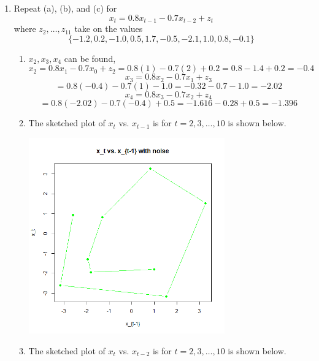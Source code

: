 \documentclass[12pt]{article}
\begin{document}
\begin{enumerate}
\begin{enumerate}
\begin{center}
        \end{center}
        \item Repeat (a), (b), and (c) for
        \[ x_t = 0.8x_{t-1} - 0.7x_{t-2} + z_t \]
        where $z_2, \ldots, z_{11}$ take on the values
        \[ 
        \{ -1.2, 0.2, -1.0, 0.5, 1.7, -0.5, -2.1, 1.0, 0.8, -0.1 \} 
        \]
        \begin{enumerate}
            \item $x_2, x_3, x_4$ can be found,
            \[ 
            x_2 = 0.8x_1 - 0.7x_0 + z_2 
            = 0.8(1) - 0.7(2) + 0.2
            = 0.8 - 1.4 + 0.2 = -0.4
            \]
            \[
            x_3 = 0.8x_2 - 0.7x_1 + z_3 
            \]
            \[
            = 0.8(-0.4) - 0.7(1) - 1.0
            = -0.32 - 0.7 - 1.0 = -2.02
            \]
            \[
            x_4 = 0.8x_3 - 0.7x_2 + z_4  
            \]
            \[
            = 0.8(-2.02) - 0.7(-0.4) + 0.5
            = -1.616 - 0.28 + 0.5 = -1.396
            \]
            \item The sketched plot of $x_t$ vs. $x_{t-1}$ is
            for $t = 2, 3, \ldots, 10$ is shown below.
            \begin{center}
                \includegraphics[width=0.7\textwidth]{Rplot12.png}
            \end{center}
            \item The sketched plot of $x_t$ vs. $x_{t-2}$ is
            for $t = 2, 3, \ldots, 10$ is shown below.
            \begin{center}

\end{center}
\end{enumerate}
\end{enumerate}
\end{enumerate}
\end{document}
